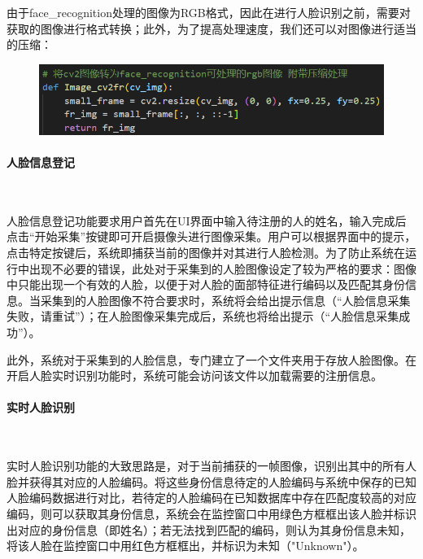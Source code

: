 \documentclass[UTF8]{article}
\begin{document}
由于face\_recognition处理的图像为RGB格式，因此在进行人脸识别之前，需要对获取的图像进行格式转换；此外，为了提高处理速度，我们还可以对图像进行适当的压缩：
\begin{figure}[H]
    \centering %
    \includegraphics[width=1\textwidth]{figure/cv2fr.png} 
\end{figure}

\paragraph{人脸信息登记}~{}

人脸信息登记功能要求用户首先在UI界面中输入待注册的人的姓名，输入完成后点击“开始采集”按键即可开启摄像头进行图像采集。用户可以根据界面中的提示，点击特定按键后，系统即捕获当前的图像并对其进行人脸检测。为了防止系统在运行中出现不必要的错误，此处对于采集到的人脸图像设定了较为严格的要求：图像中只能出现一个有效的人脸，以便于对人脸的面部特征进行编码以及匹配其身份信息。当采集到的人脸图像不符合要求时，系统将会给出提示信息（“人脸信息采集失败，请重试”）；在人脸图像采集完成后，系统也将给出提示（“人脸信息采集成功”）。

此外，系统对于采集到的人脸信息，专门建立了一个文件夹用于存放人脸图像。在开启人脸实时识别功能时，系统可能会访问该文件以加载需要的注册信息。

\paragraph{实时人脸识别}~{}

实时人脸识别功能的大致思路是，对于当前捕获的一帧图像，识别出其中的所有人脸并获得其对应的人脸编码。将这些身份信息待定的人脸编码与系统中保存的已知人脸编码数据进行对比，若待定的人脸编码在已知数据库中存在匹配度较高的对应编码，则可以获取其身份信息，系统会在监控窗口中用绿色方框框出该人脸并标识出对应的身份信息（即姓名）；若无法找到匹配的编码，则认为其身份信息未知，将该人脸在监控窗口中用红色方框框出，并标识为未知（"Unknown"）。
\end{document}
